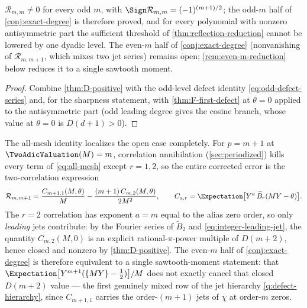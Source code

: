 \documentclass[11pt,oneside]{article}
\numberwithin{equation}{section}
\theoremstyle{definition}
\theoremstyle{remark}
\newcommand{\defect}{\mathcal R}
\begin{document}
\begin{corollary}
\label{cor:odd-sharp}
$\defect_{m,m}\ne0$ for every odd $m$, with
$\Sign\defect_{m,m}=(-1)^{(m+1)/2}$; the odd-$m$ half of
\cref{conj:exact-degree} is therefore proved, and for every polynomial
with nonzero antisymmetric part the sufficient threshold of
\cref{thm:reflection-reduction} cannot be lowered by one dyadic level.
The even-$m$ half of \cref{conj:exact-degree} (nonvanishing of
$\defect_{m,m+1}$, which mixes two jet series) remains open;
\cref{rem:even-m-reduction} below reduces it to a single sawtooth
moment.
\end{corollary}

\begin{proof}
Combine \cref{thm:D-positive} with the odd-level defect identity
\eqref{eq:odd-defect-series} and, for the sharpness statement, with
\cref{thm:F-first-defect} at $\theta=0$ applied to the antisymmetric
part (odd leading degree gives the cosine branch, whose value at
$\theta=0$ is $D(d+1)>0$).
\end{proof}

\begin{remark}
\label{rem:even-m-reduction}
The all-mesh identity localizes the open case completely.  For
$p=m+1$ at $\TwoAdicValuation(M)=m$, correlation annihilation
(\cref{sec:periodized}) kills every term of
\eqref{eq:all-mesh} except $r=1,2$, so the entire corrected error is
the two-correlation expression
\begin{equation}
 \defect_{m,m+1}
 =\frac{C_{m+1,1}(M,\theta)}{M}
 -\frac{(m+1)\,C_{m,2}(M,\theta)}{2M^{2}},
 \qquad
 C_{a,r}=\Expectation\bigl[Y^{a}\,\widetilde B_r(MY-\theta)\bigr].
 \label{eq:even-m-two-terms}
\end{equation}
The $r=2$ correlation has exponent $a=m$ equal to the alias zero
order, so only \emph{leading} jets contribute: by the Fourier series
of $\widetilde B_2$ and \eqref{eq:integer-leading-jet}, the quantity
$C_{m,2}(M,0)$ is an explicit rational-$\pi$-power multiple of
$D(m+2)$, hence closed and nonzero by \cref{thm:D-positive}.  The
even-$m$ half of \cref{conj:exact-degree} is therefore equivalent to
a single sawtooth-moment statement: that
$\Expectation\bigl[Y^{m+1}(\{MY\}-\tfrac12)\bigr]/M$ does not exactly cancel
that closed $D(m+2)$ value --- the first genuinely mixed row of the
jet hierarchy \cref{q:defect-hierarchy}, since $C_{m+1,1}$ carries
the order-$(m+1)$ jets of $\chi$ at order-$m$ zeros.
\end{remark}
\end{document}
